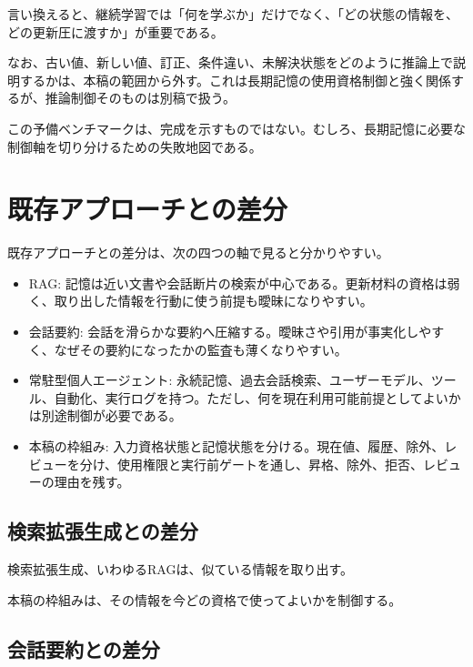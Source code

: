 \documentclass[12pt,a4paper]{article}
\begin{document}
言い換えると、継続学習では「何を学ぶか」だけでなく、「どの状態の情報を、どの更新圧に渡すか」が重要である。

なお、古い値、新しい値、訂正、条件違い、未解決状態をどのように推論上で説明するかは、本稿の範囲から外す。これは長期記憶の使用資格制御と強く関係するが、推論制御そのものは別稿で扱う。

この予備ベンチマークは、完成を示すものではない。むしろ、長期記憶に必要な制御軸を切り分けるための失敗地図である。

\section{既存アプローチとの差分}\label{ux65e2ux5b58ux30a2ux30d7ux30edux30fcux30c1ux3068ux306eux5deeux5206}

既存アプローチとの差分は、次の四つの軸で見ると分かりやすい。

\begin{itemize}
\tightlist
\item
  RAG: 記憶は近い文書や会話断片の検索が中心である。更新材料の資格は弱く、取り出した情報を行動に使う前提も曖昧になりやすい。
\item
  会話要約: 会話を滑らかな要約へ圧縮する。曖昧さや引用が事実化しやすく、なぜその要約になったかの監査も薄くなりやすい。
\item
  常駐型個人エージェント: 永続記憶、過去会話検索、ユーザーモデル、ツール、自動化、実行ログを持つ。ただし、何を現在利用可能前提としてよいかは別途制御が必要である。
\item
  本稿の枠組み: 入力資格状態と記憶状態を分ける。現在値、履歴、除外、レビューを分け、使用権限と実行前ゲートを通し、昇格、除外、拒否、レビューの理由を残す。
\end{itemize}

\subsection{検索拡張生成との差分}\label{ux691cux7d22ux62e1ux5f35ux751fux6210ux3068ux306eux5deeux5206}

検索拡張生成、いわゆるRAGは、似ている情報を取り出す。

本稿の枠組みは、その情報を今どの資格で使ってよいかを制御する。

\subsection{会話要約との差分}\label{ux4f1aux8a71ux8981ux7d04ux3068ux306eux5deeux5206}
\end{document}
